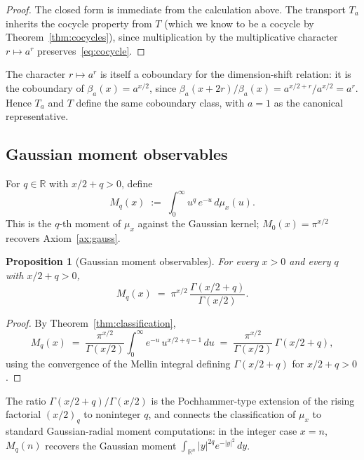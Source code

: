 \documentclass[11pt,a4paper]{article}
\theoremstyle{plain}
\newtheorem{proposition}[theorem]{Proposition}
\theoremstyle{definition}
\theoremstyle{remark}
\newcommand{\R}{\mathbb{R}}
\begin{document}
\begin{proof}
The closed form is immediate from the calculation above. The transport $T_a$ inherits the cocycle property from $T$ (which we know to be a cocycle by Theorem~\ref{thm:cocycles}), since multiplication by the multiplicative character $r\mapsto a^r$ preserves~\eqref{eq:cocycle}.
\end{proof}

The character $r\mapsto a^r$ is itself a coboundary for the dimension-shift relation: it is the coboundary of $\beta_a(x) = a^{x/2}$, since $\beta_a(x+2r)/\beta_a(x) = a^{x/2+r}/a^{x/2} = a^r$. Hence $T_a$ and $T$ define the same coboundary class, with $a=1$ as the canonical representative.

\subsection*{Gaussian moment observables}

For $q\in\R$ with $x/2 + q > 0$, define
\[
M_q(x) \;:=\; \int_0^\infty u^q\,e^{-u}\,d\mu_x(u).
\]
This is the $q$-th moment of $\mu_x$ against the Gaussian kernel; $M_0(x) = \pi^{x/2}$ recovers Axiom~\ref{ax:gauss}.

\begin{proposition}[Gaussian moment observables]\label{prop:moments}
For every $x>0$ and every $q$ with $x/2+q>0$,
\[
M_q(x) \;=\; \pi^{x/2}\,\frac{\Gamma(x/2+q)}{\Gamma(x/2)}.
\]
\end{proposition}

\begin{proof}
By Theorem~\ref{thm:classification},
\[
M_q(x) \;=\; \frac{\pi^{x/2}}{\Gamma(x/2)}\int_0^\infty e^{-u}\,u^{x/2+q-1}\,du \;=\; \frac{\pi^{x/2}}{\Gamma(x/2)}\,\Gamma(x/2+q),
\]
using the convergence of the Mellin integral defining $\Gamma(x/2+q)$ for $x/2+q>0$. \qedhere
\end{proof}

The ratio $\Gamma(x/2+q)/\Gamma(x/2)$ is the Pochhammer-type extension of the rising factorial $(x/2)_q$ to noninteger $q$, and connects the classification of $\mu_x$ to standard Gaussian-radial moment computations: in the integer case $x = n$, $M_q(n)$ recovers the Gaussian moment $\int_{\R^n} |y|^{2q}e^{-|y|^2}\,dy$.
\end{document}
